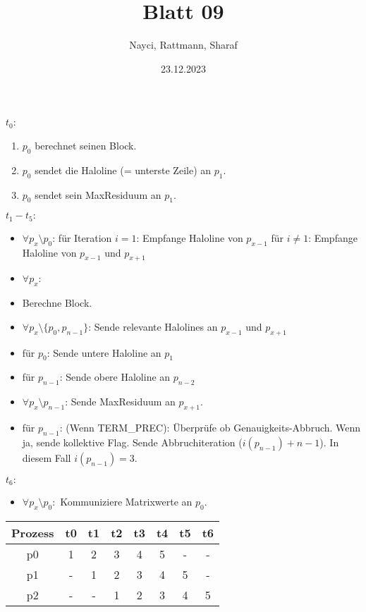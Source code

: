 \documentclass[a4paper,10pt]{article}
\title{Blatt 09}
\author{Nayci, Rattmann, Sharaf}
\date{23.12.2023}
\begin{document}
\maketitle

\section{}
$t_0$:
\begin{enumerate}
 \item $p_0$ berechnet seinen Block.
 \item $p_0$ sendet die Haloline (= unterste Zeile) an $p_1$.
 \item $p_0$ sendet sein MaxResiduum an $p_1$.
\end{enumerate}
$t_1-t_5:$
\begin{itemize}
\item $\forall p_x \setminus p_0$:
\subitem für Iteration $i = 1$: Empfange Haloline von $p_{x-1}$
\subitem für $i \neq 1$: Empfange Haloline von $p_{x-1}$ und $p_{x+1}$
\item $\forall p_x$:
\item Berechne Block.
\item $\forall p_x \setminus \{p_0, p_{n-1}\}$:
\subitem Sende relevante Halolines an $p_{x-1}$ und $p_{x+1}$
\item für $p_0$: Sende untere Haloline an $p_1$
\item für $p_{n-1}$: Sende obere Haloline an $p_{n-2}$
\item $\forall p_x \setminus p_{n-1}$: Sende MaxResiduum an $p_{x+1}$.
\item für $p_{n-1}$: (Wenn TERM\_PREC): Überprüfe ob Genauigkeits-Abbruch. Wenn ja, sende kollektive Flag. Sende Abbruchiteration ($i(p_{n-1}) + n - 1$). In diesem Fall $i(p_{n-1}) = 3$.
\end{itemize}
$t_6:$
\begin{itemize}
 \item $\forall p_x \setminus p_0:$ Kommuniziere Matrixwerte an $p_0$.
\end{itemize}

\begin{tabular}{c | c c c c c c c}
 Prozess & t0 & t1 & t2 & t3 & t4 & t5 & t6\\
 \hline
 p0 & 1 & 2 & 3 & 4 & 5 & - & - \\
 p1 & - & 1 & 2 & 3 & 4 & 5 & - \\
 p2 & - & - & 1 & 2 & 3 & 4 & 5 \\
\end{tabular}
\end{document}
